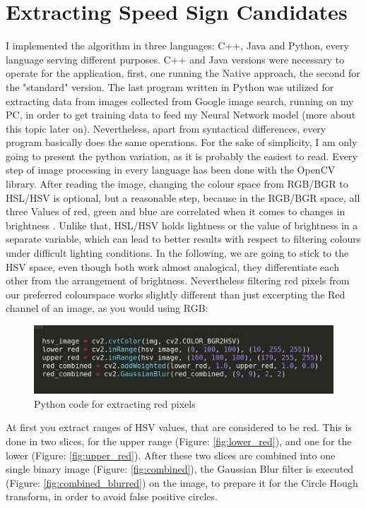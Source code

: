 \section{Extracting Speed Sign Candidates}
I implemented the algorithm in three languages: C++, Java and Python, every language serving different purposes. C++ and Java versions were necessary to operate for the application, first, one running the Native approach, the second for the "standard" version. The last program written in Python was utilized for extracting data from images collected from Google image search, running on my PC, in order to get training data to feed my Neural Network model (more about this topic later on). Nevertheless, apart from syntactical differences, every program basically does the same operations. For the sake of simplicity, I am only going to present the python variation, as it is probably the easiest to read. Every step of image processing in every language has been done with the OpenCV library. \newline
After reading the image, changing the colour space from RGB/BGR to HSL/HSV is optional, but a reasonable step, because in the RGB/BGR space, all three Values of red, green and blue are correlated when it comes to changes in brightness \cite{imagesegmentation}. Unlike that, HSL/HSV holds lightness or the value of brightness in a separate variable, which can lead to better results with respect to filtering colours under difficult lighting conditions. In the following, we are going to stick to the HSV space, even though both work almost analogical, they differentiate each other from the arrangement of brightness. \newline
Nevertheless filtering red pixels from our preferred colourspace works slightly different than just excerpting the Red channel of an image, as you would using RGB:
\begin{figure}[H]
	\minipage{\textwidth}
	\includegraphics[width=\linewidth]{images/filterredimage.jpg}
	\caption{Python code for extracting red pixels}\label{fig:filter_red_code}
	\endminipage\hfill
\end{figure}
At first you extract ranges of HSV values, that are considered to be red. This is done in two slices, for the upper range (Figure: \ref{fig:lower_red}), and one for the lower (Figure: \ref{fig:upper_red}). After these two slices are combined into one single binary image (Figure: \ref{fig:combined}), the Gaussian Blur filter is executed (Figure: \ref{fig:combined_blurred}) on the image, to prepare it for the Circle Hough transform, in order to avoid false positive circles.\newline
 

